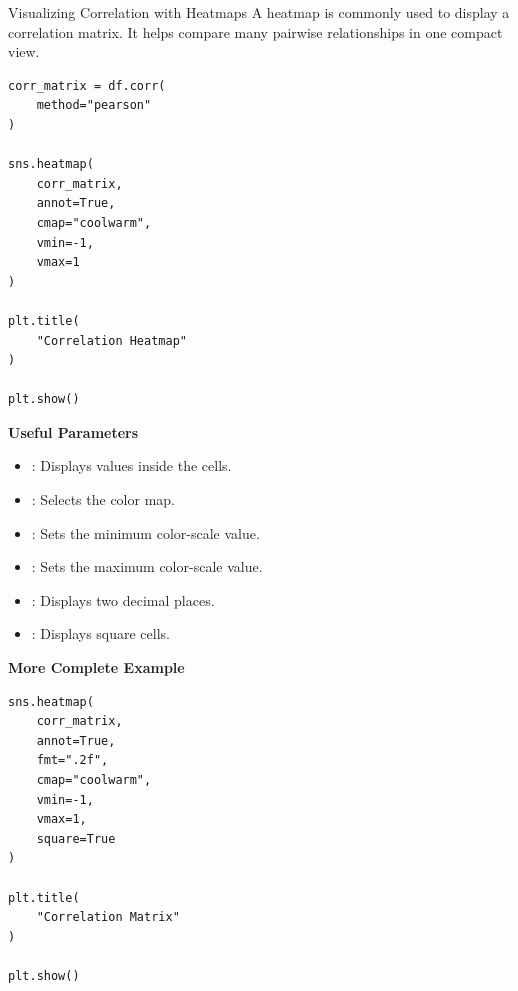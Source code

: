 \documentclass[aspectratio=169,11pt]{beamer}
\begin{document}
\begin{frame}{Visualizing Correlation with Heatmaps}
\footnotesize
A heatmap is commonly used to display a correlation matrix. It helps compare many pairwise relationships in one compact view.\par\medskip
\begin{lstlisting}[style=py]
corr_matrix = df.corr(
    method="pearson"
)

sns.heatmap(
    corr_matrix,
    annot=True,
    cmap="coolwarm",
    vmin=-1,
    vmax=1
)

plt.title(
    "Correlation Heatmap"
)

plt.show()
\end{lstlisting}
\textbf{Useful Parameters}\par\medskip
\begin{itemize}
\item \texttt{}: Displays values inside the cells.
\item \texttt{}: Selects the color map.
\item \texttt{}: Sets the minimum color-scale value.
\item \texttt{}: Sets the maximum color-scale value.
\item \texttt{}: Displays two decimal places.
\item \texttt{}: Displays square cells.
\end{itemize}
\textbf{More Complete Example}\par\medskip
\begin{lstlisting}[style=py]
sns.heatmap(
    corr_matrix,
    annot=True,
    fmt=".2f",
    cmap="coolwarm",
    vmin=-1,
    vmax=1,
    square=True
)

plt.title(
    "Correlation Matrix"
)

plt.show()
\end{lstlisting}
\end{frame}
\end{document}
